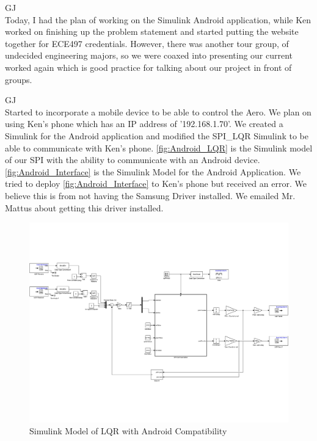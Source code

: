 \documentclass[fontsize=11pt, %
                             paper=letter, %
                             openany, %
                             captions=tableheading,
                             index=totoc,
                             hyperref]{labbook}
\begin{document}
\begin{addmargin}[0cm]{0cm}
GJ\\
Today, I had the plan of working on the Simulink Android application, while Ken worked on finishing up the problem statement and started putting the website together for ECE497 credentials.  However, there was another tour group, of undecided engineering majors, so we were coaxed into presenting our current worked again which is good practice for talking about our project in front of groups.  

GJ\\
Started to incorporate a mobile device to be able to control the Aero.  We plan on using Ken's phone which has an IP address of '192.168.1.70'.  We created a Simulink for the Android application and modified the SPI\_LQR Simulink to be able to communicate with Ken's phone.  \autoref{fig:Android_LQR} is the Simulink model of our SPI with the ability to communicate with an Android device.  \autoref{fig:Android_Interface} is the Simulink Model for the Android Application.  We tried to deploy \autoref{fig:Android_Interface} to Ken's phone but received an error.  We believe this is from not having the Samsung Driver installed.  We emailed Mr. Mattus about getting this driver installed.

\begin{figure}[h]
  \centering
  \includegraphics[width=1\textwidth]{figs/img/Android_LQR}
  \caption{Simulink Model of LQR with Android Compatibility}
  \label{fig:Android_LQR}
\end{figure}


\end{addmargin}
\end{document}
